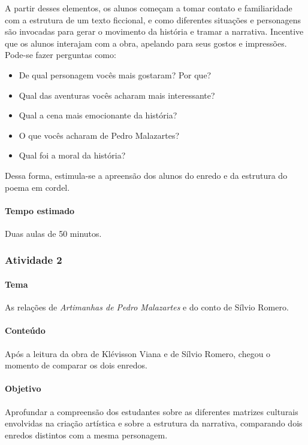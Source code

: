 \documentclass[11pt]{extarticle}
\begin{document}
A partir desses elementos, os alunos começam a tomar contato e familiaridade com a estrutura de um texto ficcional, e como diferentes situações e personagens são invocadas para gerar o movimento da história e tramar a narrativa. Incentive que os alunos interajam com a obra, apelando para seus gostos e impressões.
Pode-se fazer perguntas como:

\begin{itemize}
\item De qual personagem vocês mais gostaram? Por que?

\item Qual das aventuras vocês acharam mais interessante?

\item Qual a cena mais emocionante da história?

\item O que vocês acharam de Pedro Malazartes?

\item Qual foi a moral da história?

\end{itemize}

Dessa forma, estimula-se a apreensão dos alunos do enredo e da estrutura do poema em cordel.

\paragraph{Tempo estimado} Duas aulas de 50 minutos.


\subsubsection{Atividade 2}


\paragraph{Tema} As relações de \textit{Artimanhas de Pedro Malazartes} e do conto de Sílvio Romero.

\paragraph{Conteúdo} Após a leitura da obra de Klévisson Viana e de Sílvio Romero, chegou o momento de comparar os dois enredos.

\paragraph{Objetivo} Aprofundar a compreensão dos estudantes sobre as diferentes matrizes culturais envolvidas na criação artística e sobre a estrutura da narrativa, comparando dois enredos distintos com a mesma personagem.
\end{document}
